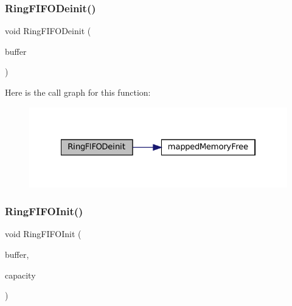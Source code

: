 \subsubsection{\texorpdfstring{Ring\+F\+I\+F\+O\+Deinit()}{RingFIFODeinit()}}
{\footnotesize\ttfamily void Ring\+F\+I\+F\+O\+Deinit (\begin{DoxyParamCaption}\item[{struct Ring\+F\+I\+FO $\ast$}]{buffer }\end{DoxyParamCaption})}

Here is the call graph for this function\+:
\nopagebreak
\begin{figure}[H]
\begin{center}
\leavevmode
\includegraphics[width=322pt]{ring-fifo_8c_a19b32b736d996fac60c9812e5763391d_cgraph}
\end{center}
\end{figure}
\mbox{\label{ring-fifo_8c_a2dc51a008dd649da7f0ceb1db622b9c3}} 
\subsubsection{\texorpdfstring{Ring\+F\+I\+F\+O\+Init()}{RingFIFOInit()}}
{\footnotesize\ttfamily void Ring\+F\+I\+F\+O\+Init (\begin{DoxyParamCaption}\item[{struct Ring\+F\+I\+FO $\ast$}]{buffer,  }\item[{size\+\_\+t}]{capacity }\end{DoxyParamCaption})}

